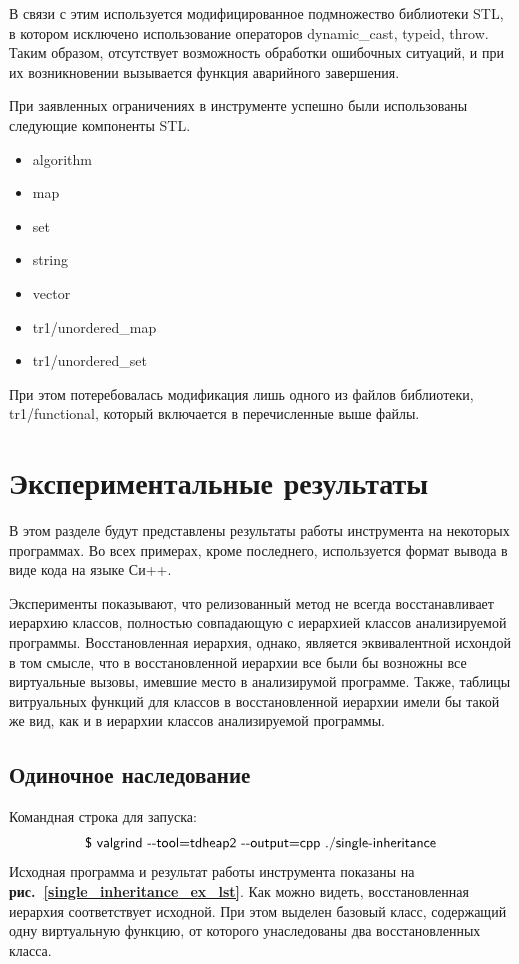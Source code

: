 \documentclass[a4paper,12pt,russian]{article}
\newcommand{\picref}[1]{\textbf{рис.~\ref{#1}}}
\newcommand{\code}[1]{\textsf{#1}}
\begin{document}
В связи с этим используется модифицированное подмножество библиотеки \code{STL}, в котором исключено использование операторов \code{dynamic\_cast}, \code{typeid}, \code{throw}. Таким образом, отсутствует возможность обработки ошибочных ситуаций, и при их возникновении вызывается функция аварийного завершения.

При заявленных ограничениях в инструменте успешно были использованы следующие компоненты \code{STL}.
\begin{itemize}
    \item \code{algorithm}
    \item \code{map}
    \item \code{set}
    \item \code{string}
    \item \code{vector}
    \item \code{tr1/unordered\_map}
    \item \code{tr1/unordered\_set}
\end{itemize}
При этом потеребовалась модификация лишь одного из файлов библиотеки, \code{tr1/functional}, который включается в перечисленные выше файлы.

\newpage
\section{Экспериментальные результаты}
В этом разделе будут представлены результаты работы инструмента на некоторых программах. Во всех примерах, кроме последнего, используется формат вывода в виде кода на языке Си++.

Эксперименты показывают, что релизованный метод не всегда восстанавливает иерархию классов, полностью совпадающую с иерархией классов анализируемой программы.
Восстановленная иерархия, однако, является эквивалентной исхондой в том смысле, что в восстановленной иерархии все были бы возножны все виртуальные вызовы, имевшие место в анализирумой программе.
Также, таблицы витруальных функций для классов в восстановленной иерархии имели бы такой же вид, как и в иерархии классов анализируемой программы.

\subsection{Одиночное наследование}
Командная строка для запуска:
\[\mbox{\code{\$ valgrind -{}-tool=tdheap2 -{}-output=cpp ./single-inheritance}}\]
Исходная программа и результат работы инструмента показаны на \picref{single_inheritance_ex_lst}.
Как можно видеть, восстановленная иерархия соответствует исходной.
При этом выделен базовый класс, содержащий одну виртуальную функцию, от которого унаследованы два восстановленных класса.
\end{document}
